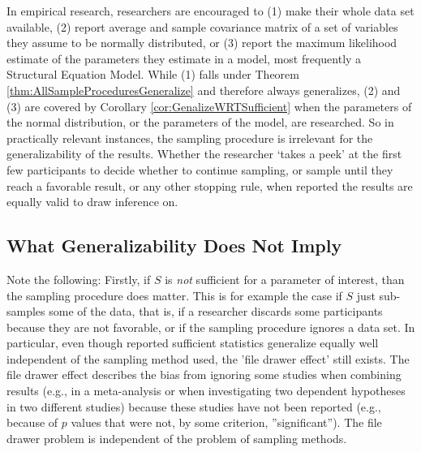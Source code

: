 \documentclass[man]{apa7}\usepackage[]{graphicx}\usepackage[]{xcolor}
\theoremstyle{definition}
\begin{document}
In empirical research, researchers are encouraged to (1) make their whole data set available, (2) report average and sample covariance matrix of a set of variables they assume to be normally distributed, or (3) report the maximum likelihood estimate of the parameters they estimate in a model, most frequently a Structural Equation Model. While (1) falls under Theorem \ref{thm:AllSampleProceduresGeneralize} and therefore always generalizes, (2) and (3) are covered by Corollary \ref{cor:GenalizeWRTSufficient} when the parameters of the normal distribution, or the parameters of the model, are researched. So in practically relevant instances, the sampling procedure is irrelevant for the generalizability of the results. Whether the researcher `takes a peek' at the first few participants to decide whether to continue sampling, or sample until they reach a favorable result, or any other stopping rule, when reported the results are equally valid to draw inference on. 

\subsection{What Generalizability Does Not Imply}
\label{sub:DoesNotImply}
Note the following: Firstly, if $S$ is \emph{not} sufficient for a parameter of interest, than the sampling procedure does matter. This is for example the case if $S$ just sub-samples some of the data, that is, if a researcher discards some participants because they are not favorable, or if the sampling procedure ignores a data set. In particular, even though reported sufficient statistics generalize equally well independent of the sampling method used, the 'file drawer effect' still exists. The file drawer effect describes the bias from ignoring some studies when combining results (e.g., in a meta-analysis or when investigating two dependent hypotheses in two different studies) because these studies have not been reported (e.g., because of $p$ values that were not, by some criterion, ''significant''). The file drawer problem is independent of the problem of sampling methods.
\end{document}
